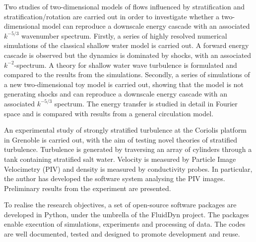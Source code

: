 \noindent%
Two studies of two-dimensional models of flows influenced by stratification and stratification/rotation are carried out in
order to investigate whether a two-dimensional model can reproduce a downscale energy cascade with an associated $ k^{-5/3} $ wavenumber  spectrum.
 Firstly, a series of highly resolved numerical simulations of the classical shallow water model is carried out. A forward energy cascade is observed but the dynamics is dominated by shocks, with an associated $ k^{-2} $-spectrum.
A theory for shallow water wave turbulence is formulated and compared to the results from the simulations.
 Secondly, a series of simulations of a new two-dimensional toy model is carried out, showing that  the model is not generating  shocks and can reproduce a downscale energy cascade with
an associated $ k^{-5/3} $ spectrum. The energy transfer is studied in detail in Fourier space and is compared with results from a general circulation model.

An experimental study of strongly stratified turbulence at the Coriolis platform in Grenoble is carried out, with the aim of testing novel theories of stratified turbulence. Turbulence is generated by traversing an array of cylinders through a tank containing stratified salt water. Velocity is measured by Particle Image Velocimetry (PIV) and density is measured by conductivity probes. In particular, the author has developed the software system analysing the PIV images. Preliminary results from the experiment are presented.

 To realise the research objectives, a set of open-source software packages are developed in Python, under the
umbrella of the FluidDyn project. The
packages enable execution of simulations, experiments and processing of data.
The codes are well documented, tested and designed to
promote development and reuse.

